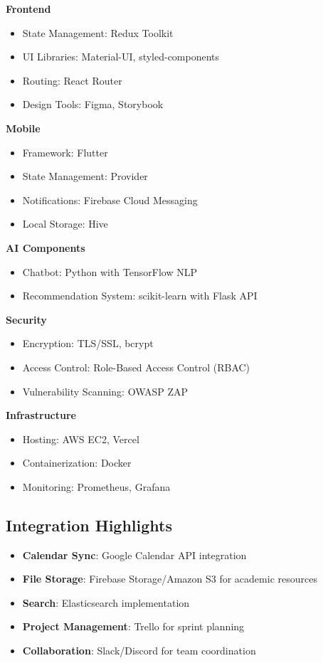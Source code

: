 \textbf{Frontend}
\begin{itemize}
    \item State Management: Redux Toolkit
    \item UI Libraries: Material-UI, styled-components
    \item Routing: React Router
    \item Design Tools: Figma, Storybook
\end{itemize}

\textbf{Mobile}
\begin{itemize}
    \item Framework: Flutter
    \item State Management: Provider
    \item Notifications: Firebase Cloud Messaging
    \item Local Storage: Hive
\end{itemize}

\textbf{AI Components}
\begin{itemize}
    \item Chatbot: Python with TensorFlow NLP
    \item Recommendation System: scikit-learn with Flask API
\end{itemize}

\textbf{Security}
\begin{itemize}
    \item Encryption: TLS/SSL, bcrypt
    \item Access Control: Role-Based Access Control (RBAC)
    \item Vulnerability Scanning: OWASP ZAP
\end{itemize}

\textbf{Infrastructure}
\begin{itemize}
    \item Hosting: AWS EC2, Vercel
    \item Containerization: Docker
    \item Monitoring: Prometheus, Grafana
\end{itemize}

\subsection{Integration Highlights}
\begin{itemize}
    \item \textbf{Calendar Sync}: Google Calendar API integration
    \item \textbf{File Storage}: Firebase Storage/Amazon S3 for academic resources
    \item \textbf{Search}: Elasticsearch implementation
    \item \textbf{Project Management}: Trello for sprint planning
    \item \textbf{Collaboration}: Slack/Discord for team coordination
\end{itemize}